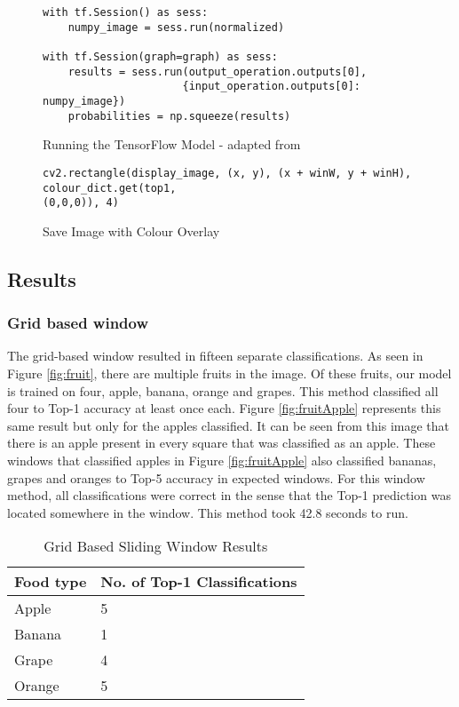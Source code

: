 \begin{figure}[h]
\caption{Running the TensorFlow Model - adapted from \parencite{retrainInception}}
\label{lst:runModel}
\begin{lstlisting}[style=Python]
with tf.Session() as sess:
	numpy_image = sess.run(normalized)

with tf.Session(graph=graph) as sess:
    results = sess.run(output_operation.outputs[0],
                      {input_operation.outputs[0]: numpy_image})
	probabilities = np.squeeze(results)
\end{lstlisting}
\end{figure}

\begin{figure}[h]
\caption{Save Image with Colour Overlay}
\label{lst:colourOverlay}
\begin{lstlisting}[style=Python]
cv2.rectangle(display_image, (x, y), (x + winW, y + winH), colour_dict.get(top1,
(0,0,0)), 4)
\end{lstlisting}
\end{figure}

\tocless\subsection{Results}
\tocless\subsubsection{Grid based window}
The grid-based window resulted in fifteen separate classifications. As seen in Figure
\ref{fig:fruit}, there are multiple fruits in the image. Of these fruits, our
model is trained on four, apple, banana, orange and grapes. This method
classified all four to Top-1 accuracy at least once each.
Figure \ref{fig:fruitApple} represents this same result but only for the apples classified.
It can be seen from this image that there is an apple present in every square that was classified as an apple.
These windows that classified apples in Figure \ref{fig:fruitApple} also classified bananas, grapes and oranges to Top-5 accuracy in expected windows.
For this window method, all classifications were correct in the sense that the Top-1 prediction was located somewhere in the window.
This method took 42.8 seconds to run.


\begin{table}[h]
	\centering
	\caption{Grid Based Sliding Window Results}
	\label{my-label}
	\begin{tabular}{|l|l|}
	\hline
		\textbf{Food type} & \textbf{No. of Top-1 Classifications} \\ \hline
		Apple     & 5                      \\ \hline
		Banana    & 1                      \\ \hline
		Grape     & 4                      \\ \hline
		Orange    & 5                     \\ \hline
	\end{tabular}
\end{table}

